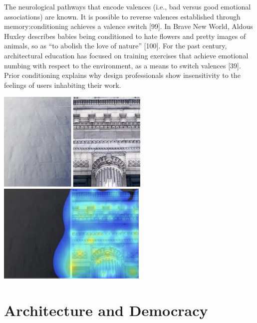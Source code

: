 \documentclass[a4paper]{article}
\begin{document}
The neurological pathways that encode valences (i.e., bad versus good emotional associations) are known. It is possible to reverse valences established through memory:conditioning achieves a valence switch [99]. In Brave New World, Aldous Huxley describes babies being conditioned to hate flowers and pretty images of animals, so as “to abolish the love of nature” [100]. For the past century, architectural education has focused on training exercises that achieve emotional numbing with respect to the environment, as a means to switch valences [39]. Prior conditioning explains why design professionals show insensitivity to the feelings of users inhabiting their work.

\includegraphics[height=4.75cm]{figures/beautyscale_image.png}
\includegraphics[height=4.75cm]{figures/beautyscale_heatmap.png}
\label{fig:heatmap}

\clearpage
\section{Architecture and Democracy}
\end{document}

